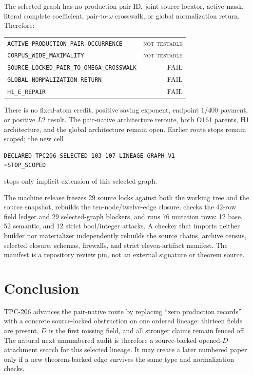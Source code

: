 \documentclass[11pt]{article}
\newcommand{\NT}{\textsc{not testable}}
\newcommand{\code}[1]{\nolinkurl{#1}}
\begin{document}
The selected graph has no production pair ID, joint source locator, active
mask, literal complete coefficient, pair-to-\(\omega\) crosswalk, or global
normalization return.  Therefore:
\begin{center}
\small
\begin{tabular}{@{}lr@{}}
\code{ACTIVE_PRODUCTION_PAIR_OCCURRENCE} & \NT\\
\code{CORPUS_WIDE_MAXIMALITY} & \NT\\
\code{SOURCE_LOCKED_PAIR_TO_OMEGA_CROSSWALK} & FAIL\\
\code{GLOBAL_NORMALIZATION_RETURN} & FAIL\\
\code{H1_E_REPAIR} & FAIL
\end{tabular}
\end{center}
There is no fixed-atom credit, positive saving exponent, endpoint
\(1/400\) payment, or positive \(L2\) result.  The pair-native architecture
reroute, both O161 parents, H1 architecture, and the global architecture
remain open.  Earlier route stops remain scoped; the new cell
\begin{center}
\small
\code{DECLARED_TPC206_SELECTED_103_107_LINEAGE_GRAPH_V1}\\
\code{=STOP_SCOPED}
\end{center}
stops only implicit extension of this selected graph.

The machine release freezes 29 source locks against both the working tree
and the source snapshot, rebuilds the ten-node/twelve-edge closure, checks
the 42-row field ledger and 29 selected-graph blockers, and runs 76 mutation
rows: 12 base, 52 semantic, and 12 strict bool/integer attacks.  A checker
that imports neither builder nor materializer independently rebuilds the
source chains, archive census, selected closure, schemas, firewalls, and
strict eleven-artifact manifest.  The manifest is a repository review pin,
not an external signature or theorem source.

\section{Conclusion}

TPC-206 advances the pair-native route by replacing ``zero production
records'' with a concrete source-locked obstruction on one ordered lineage:
thirteen fields are present, \(D\) is the first missing field, and all
stronger claims remain fenced off.  The natural next unnumbered audit is
therefore a source-backed opened-\(D\) attachment search for this selected
lineage.  It may create a later numbered paper only if a new theorem-backed
edge survives the same type and normalization checks.



\end{document}
